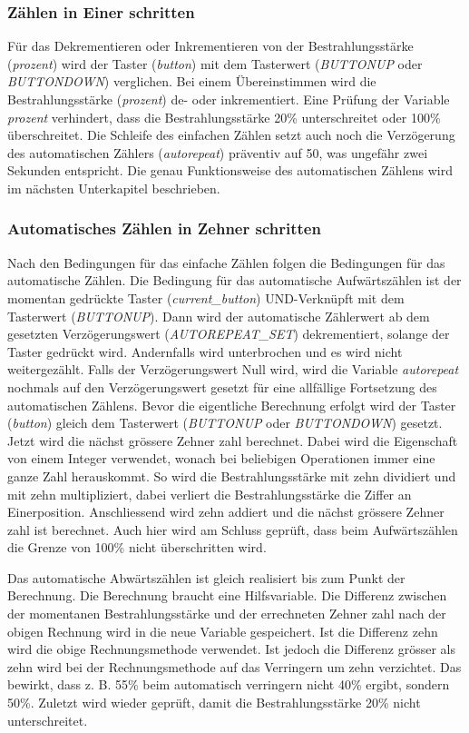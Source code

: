 \subsubsection{Zählen in Einer schritten}
Für das Dekrementieren oder Inkrementieren von der Bestrahlungsstärke (\textit{prozent}) wird der Taster (\textit{button}) mit dem Tasterwert (\textit{BUTTONUP} oder \textit{BUTTONDOWN}) verglichen. Bei einem Übereinstimmen wird die Bestrahlungsstärke (\textit{prozent}) de- oder inkrementiert. Eine Prüfung der Variable \textit{prozent} verhindert, dass die Bestrahlungsstärke 20\% unterschreitet oder 100\% überschreitet. Die Schleife des einfachen Zählen setzt auch noch die Verzögerung des automatischen Zählers (\textit{autorepeat}) präventiv auf 50, was ungefähr zwei Sekunden entspricht. Die genau Funktionsweise des automatischen Zählens wird im nächsten Unterkapitel beschrieben.

\subsubsection{Automatisches Zählen in Zehner schritten}
Nach den Bedingungen für das einfache Zählen folgen die Bedingungen für das automatische Zählen. Die Bedingung für das automatische Aufwärtszählen ist der momentan gedrückte Taster (\textit{current\_button}) UND-Verknüpft mit dem Tasterwert (\textit{BUTTONUP}). Dann wird der automatische Zählerwert ab dem gesetzten Verzögerungswert (\textit{AUTOREPEAT\_SET}) dekrementiert, solange der Taster gedrückt wird. Andernfalls wird unterbrochen und es wird nicht weitergezählt. Falls der Verzögerungswert Null wird, wird die Variable \textit{autorepeat} nochmals auf den Verzögerungswert gesetzt für eine allfällige Fortsetzung des automatischen Zählens. Bevor die eigentliche Berechnung erfolgt wird der Taster (\textit{button}) gleich dem Tasterwert (\textit{BUTTONUP} oder \textit{BUTTONDOWN}) gesetzt. Jetzt wird die nächst grössere Zehner zahl berechnet. Dabei wird die Eigenschaft von einem Integer verwendet, wonach bei beliebigen Operationen immer eine ganze Zahl herauskommt. So wird die Bestrahlungsstärke mit zehn dividiert und mit zehn multipliziert, dabei verliert die Bestrahlungsstärke die Ziffer an Einerposition. Anschliessend wird zehn addiert und die nächst grössere Zehner zahl ist berechnet. Auch hier wird am Schluss geprüft, dass beim Aufwärtszählen die Grenze von 100\% nicht überschritten wird.

Das automatische Abwärtszählen ist gleich realisiert bis zum Punkt der Berechnung. Die Berechnung braucht eine Hilfsvariable. Die Differenz zwischen der momentanen Bestrahlungsstärke und der errechneten Zehner zahl nach der obigen Rechnung wird in die neue Variable gespeichert. Ist die Differenz zehn wird die obige Rechnungsmethode verwendet. Ist jedoch die Differenz grösser als zehn wird bei der Rechnungsmethode auf das Verringern um zehn verzichtet. Das bewirkt, dass z. B. 55\% beim automatisch verringern nicht 40\% ergibt, sondern 50\%. Zuletzt wird wieder geprüft, damit die Bestrahlungsstärke 20\% nicht unterschreitet.

